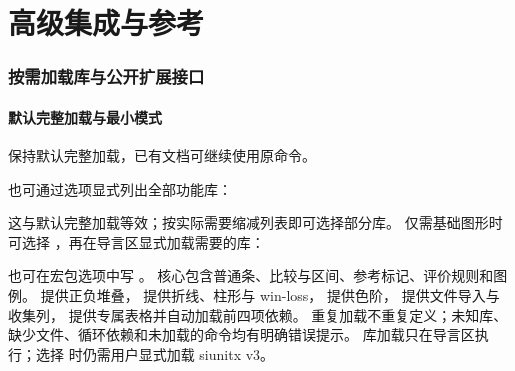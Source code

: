 \part{高级集成与参考}

\section{按需加载库与公开扩展接口}
\subsection{默认完整加载与最小模式}
\key{\usepackage{gradbars}} 保持默认完整加载，已有文档可继续使用原命令。\par
也可通过选项显式列出全部功能库：
\begin{codeonly}
\usepackage[libraries={stack,spark,heat,csv,table}]{gradbars}
\end{codeonly}
这与默认完整加载等效；按实际需要缩减列表即可选择部分库。
仅需基础图形时可选择 ，再在导言区显式加载需要的库：
\begin{codeonly}
\usepackage[libraries=none]{gradbars}
\end{codeonly}
也可在宏包选项中写 。
核心包含普通条、比较与区间、参考标记、评价规则和图例。
 提供正负堆叠， 提供折线、柱形与 win-loss， 提供色阶，
 提供文件导入与收集列， 提供专属表格并自动加载前四项依赖。
重复加载不重复定义；未知库、缺少文件、循环依赖和未加载的命令均有明确错误提示。
库加载只在导言区执行；选择  时仍需用户显式加载 siunitx v3。
